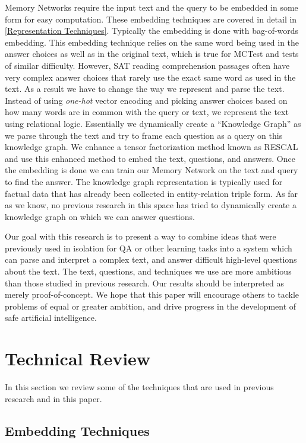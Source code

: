 \documentclass[pageno]{jpaper}
\begin{document}
Memory Networks require the input text and the query to be embedded in some form
for easy computation. These embedding techniques are covered in detail in
\ref{Representation Techniques}. Typically the embedding is done with
bag-of-words embedding. This embedding technique relies on the same word being
used in the answer choices as well as in the original text, which is true for
MCTest and tests of similar difficulty. However, SAT reading comprehension
passages often have very complex answer choices that rarely use the exact same
word as used in the text. As a result we have to change the way we represent and
parse the text. Instead of using \textit{one-hot} vector encoding and picking
answer choices based on how many words are in common with the query or text, we
represent the text using relational logic. Essentially we dynamically create a
``Knowledge Graph'' as we parse through the text and try to frame each question
as a query on this knowledge graph. We enhance a tensor factorization method
known as RESCAL \cite{Bader2007}\cite{Nickel2011} and use this enhanced method
to embed the text, questions, and answers. Once the embedding is done we can
train our Memory Network on the text and query to find the answer. The knowledge
graph representation is typically used for factual data that has already been
collected in entity-relation triple form. As far as we know, no previous
research in this space has tried to dynamically create a knowledge graph on
which we can answer questions.

Our goal with this research is to present a way to combine ideas that were
previously used in isolation for QA or other learning tasks into a system which
can parse and interpret a complex text, and answer difficult high-level
questions about the text. The text, questions, and techniques we use are more
ambitious than those studied in previous research. Our results should be
interpreted as merely proof-of-concept. We hope that this paper will encourage
others to tackle problems of equal or greater ambition, and drive progress in
the development of safe artificial intelligence.

\section{Technical Review}
\label{Technical Review}

In this section we review some of the techniques that are used in previous
research and in this paper.

\subsection{Embedding Techniques}
\label{Embedding Techniques}
\end{document}
